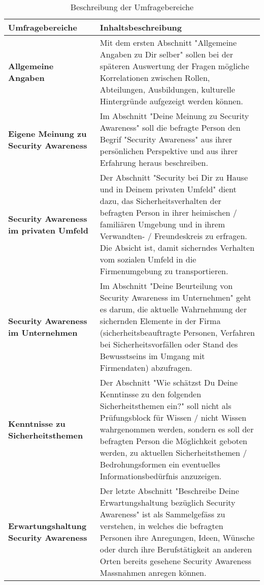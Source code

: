 \documentclass[../../main.tex]{subfiles}
\begin{document}
\begin{table}[H]
\tablefontsize	
\centering
\caption{Beschreibung der Umfragebereiche}
\label{Beschreibung der Umfragebereiche}
\begin{tabular}{ |p{3cm}|p{12.5cm}|}

\hline
\tableheaderbgcolor
\textbf{Umfragebereiche} & \textbf{Inhaltsbeschreibung} \\ 
\hline
\textbf{Allgemeine \newline Angaben}                &  Mit dem ersten Abschnitt "Allgemeine Angaben zu Dir selber" sollen bei der späteren Auswertung der Fragen mögliche Korrelationen zwischen Rollen, Abteilungen, Ausbildungen, kulturelle Hintergründe aufgezeigt werden können. \\
\hline
\textbf{Eigene Meinung zu \newline Security Awareness}                &  Im Abschnitt "Deine Meinung zu Security Awareness" soll die befragte Person den Begrif "Security Awareness" aus ihrer persönlichen Perspektive und aus ihrer Erfahrung heraus beschreiben.  \\
\hline
\textbf{Security Awareness \newline im privaten Umfeld}                &  Der Abschnitt "Security bei Dir zu Hause und in Deinem privaten Umfeld" dient dazu, das Sicherheitsverhalten der befragten Person in ihrer heimischen / familiären Umgebung und in ihrem Verwandten- / Freundeskreis zu erfragen. Die Absicht ist, damit sicherndes Verhalten vom sozialen Umfeld in die Firmenumgebung zu transportieren. \\
\hline
\textbf{Security Awareness \newline im Unternehmen}                &  Im Abschnitt "Deine Beurteilung von Security Awareness im Unternehmen" geht es darum, die aktuelle Wahrnehmung der sichernden Elemente in der Firma (sicherheitsbeauftragte Personen, Verfahren bei Sicherheitsvorfällen oder Stand des Bewusstseins im Umgang mit Firmendaten) abzufragen. \\
\hline
\textbf{Kenntnisse zu \newline Sicherheitsthemen}                &  Der Abschnitt "Wie schätzst Du Deine Kenntinsse zu den folgenden Sicherheitsthemen ein?" soll nicht als Prüfungsblock für Wissen / nicht Wissen wahrgenommen werden, sondern es soll der befragten Person die Möglichkeit geboten werden, zu aktuellen Sicherheitsthemen / Bedrohungsformen ein eventuelles Informationsbedürfnis anzuzeigen. \\
\hline
\textbf{Erwartungshaltung \newline Security Awareness}                &  Der letzte Abschnitt "Beschreibe Deine Erwartungshaltung bezüglich Security Awareness" ist als Sammelgefäss zu verstehen, in welches die befragten Personen ihre Anregungen, Ideen, Wünsche oder durch ihre Berufstätigkeit an anderen Orten bereits gesehene Security Awareness Massnahmen anregen können. \\
\hline

\end{tabular}
\end{table}
\end{document}
